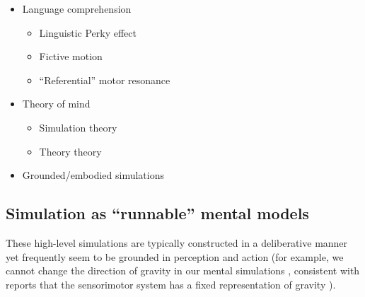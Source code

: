 \documentclass[12pt]{article}
\begin{document}
\begin{itemize}
\item Language comprehension
    \begin{itemize}
    \item Linguistic Perky effect \citep{Bergen2007}
    \item Fictive motion \citep{Matlock2004}
    \item ``Referential'' motor resonance \citep{Fischer2008}
    \end{itemize}
\item Theory of mind
    \begin{itemize}
    \item Simulation theory \citep{Goldman1992,Gordon1992,Gallese1998}
    \item Theory theory \citep{Stich1992,Gopnik1992,Saxe2005}
    \end{itemize}
\item Grounded/embodied simulations \citep{Barsalou1999}
\end{itemize}

\subsection*{Simulation as ``runnable'' mental models}

These high-level simulations are typically constructed in a deliberative manner yet frequently seem to be grounded in perception and action (for example, we cannot change the direction of gravity in our mental simulations \citep{Schwartz1999a}, consistent with reports that the sensorimotor system has a fixed representation of gravity \citep{Zago2005}).
\end{document}
